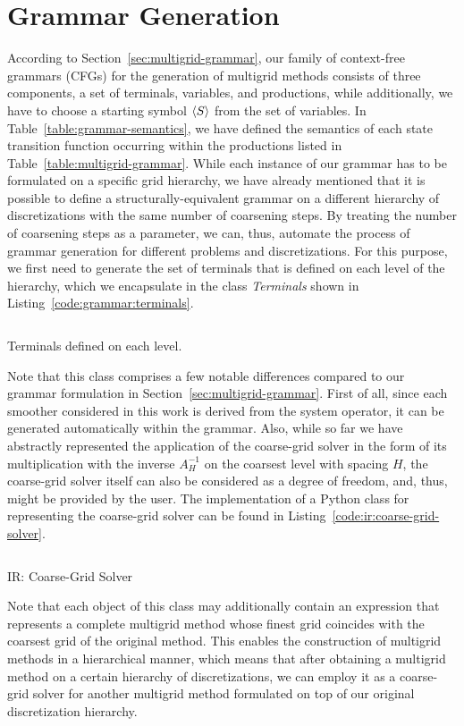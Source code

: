 \section{Grammar Generation}
According to Section~\ref{sec:multigrid-grammar}, our family of context-free grammars (CFGs) for the generation of multigrid methods consists of three components, a set of terminals, variables, and productions, while additionally, we have to choose a starting symbol $\langle S \rangle$ from the set of variables.
In Table~\ref{table:grammar-semantics}, we have defined the semantics of each state transition function occurring within the productions listed in Table~\ref{table:multigrid-grammar}.
While each instance of our grammar has to be formulated on a specific grid hierarchy, we have already mentioned that it is possible to define a structurally-equivalent grammar on a different hierarchy of discretizations with the same number of coarsening steps.
By treating the number of coarsening steps as a parameter, we can, thus, automate the process of grammar generation for different problems and discretizations.
For this purpose, we first need to generate the set of terminals that is defined on each level of the hierarchy, which we encapsulate in the class \emph{Terminals} shown in Listing~\ref{code:grammar:terminals}.
\begin{listing}
	\inputminted{python}{evostencils/grammar/terminals.py}
	\caption{Terminals defined on each level.}
	\label{code:grammar:terminals}
\end{listing}
Note that this class comprises a few notable differences compared to our grammar formulation in Section~\ref{sec:multigrid-grammar}.
First of all, since each smoother considered in this work is derived from the system operator, it can be generated automatically within the grammar.
Also, while so far we have abstractly represented the application of the coarse-grid solver in the form of its multiplication with the inverse $A^{-1}_H$ on the coarsest level with spacing $H$, the coarse-grid solver itself can also be considered as a degree of freedom, and, thus, might be provided by the user.
The implementation of a Python class for representing the coarse-grid solver can be found in Listing~\ref{code:ir:coarse-grid-solver}.
\begin{listing}
	\inputminted{python}{evostencils/ir/coarse_grid_solver.py}
	\caption{IR: Coarse-Grid Solver}
	\label{code:ir:coarse-grid-solver}
\end{listing}
Note that each object of this class may additionally contain an expression that represents a complete multigrid method whose finest grid coincides with the coarsest grid of the original method.
This enables the construction of multigrid methods in a hierarchical manner, which means that after obtaining a multigrid method on a certain hierarchy of discretizations, we can employ it as a coarse-grid solver for another multigrid method formulated on top of our original discretization hierarchy.

